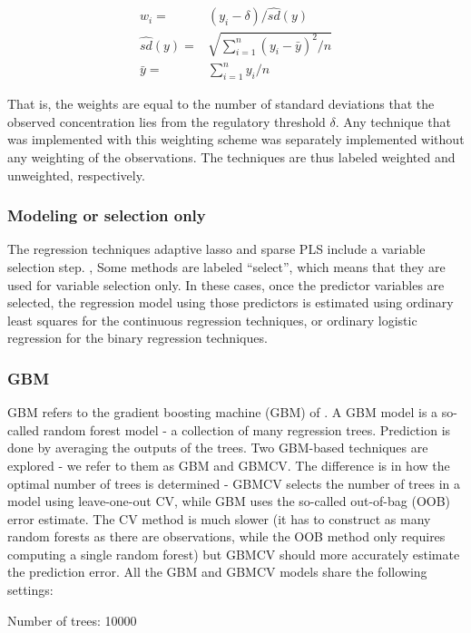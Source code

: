 \documentclass{article}\usepackage[]{graphicx}\usepackage[]{color}
\numberwithin{equation}{section}
\numberwithin{figure}{section}
\renewcommand\[{\begin{equation}}
\renewcommand\]{\end{equation}}
\begin{document}
\begin{align*}
w_{i}= & (y_{i}-\delta)/\hat{{sd}}(y)\\
\hat{{sd}}(y)= & \sqrt{\sum_{i=1}^{n}(y_{i}-\bar{{y}})^{2}/n}\\
\bar{{y}}= & \sum_{i=1}^{n}y_{i}/n
\end{align*}


That is, the weights are equal to the number of standard deviations
that the observed concentration lies from the regulatory threshold
$\delta$. Any technique that was implemented with this weighting
scheme was separately implemented without any weighting of the observations.
The techniques are thus labeled weighted and unweighted, respectively.


\subsubsection*{Modeling or selection only}

The regression techniques adaptive lasso and sparse PLS include a
variable selection step. , Some methods are labeled ``select'',
which means that they are used for variable selection only. In these
cases, once the predictor variables are selected, the regression model
using those predictors is estimated using ordinary least squares for
the continuous regression techniques, or ordinary logistic regression
for the binary regression techniques.


\subsubsection{GBM}

GBM refers to the gradient boosting machine (GBM) of \citet{Friedman-2001}.
A GBM model is a so-called random forest model - a collection of many
regression trees. Prediction is done by averaging the outputs of the
trees. Two GBM-based techniques are explored - we refer to them as
GBM and GBMCV. The difference is in how the optimal number of trees
is determined - GBMCV selects the number of trees in a model using
leave-one-out CV, while GBM uses the so-called out-of-bag (OOB) error
estimate. The CV method is much slower (it has to construct as many
random forests as there are observations, while the OOB method only
requires computing a single random forest) but GBMCV should more accurately
estimate the prediction error. All the GBM and GBMCV models share
the following settings:

Number of trees: 10000
\end{document}
